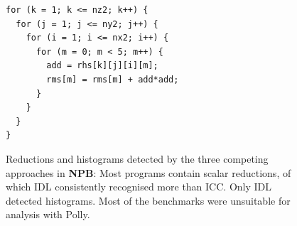 \begin{figure}[H]
\begin{lstlisting}[language=MyCpp, label={missedscalar}, caption=
   {Some reductions were missed by all detection approaches:
    In this loop from ``SP'', the outer loops are reduction loops,
    accumulating into the scalar variables
    \texttt{rms[0]},\dots,\texttt{rms[4]},
    but the innermost loop is not a reduction, and it is therefore not captured
    by the IDL specification.}]
for (k = 1; k <= nz2; k++) {
  for (j = 1; j <= ny2; j++) {
    for (i = 1; i <= nx2; i++) {
      for (m = 0; m < 5; m++) {
        add = rhs[k][j][i][m];
        rms[m] = rms[m] + add*add;
      } 
    } 
  } 
}
\end{lstlisting}
\end{figure}

\begin{figure}[p]
  \centering
    \caption{Reductions and histograms detected by the three competing
             approaches in {\bf NPB}:
             Most programs contain scalar reductions, of which IDL consistently
             recognised more than ICC.
             Only IDL detected histograms.
             Most of the benchmarks were unsuitable for analysis with Polly.}
    \label{npb_spotted}
    \vspace{2.7mm}

\end{figure}
